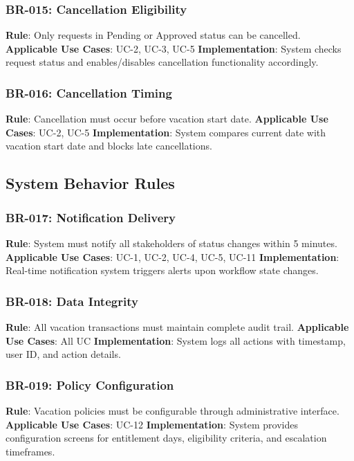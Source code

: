 \documentclass[12pt,a4paper]{article}
\begin{document}
\subsubsection{BR-015: Cancellation Eligibility}
\textbf{Rule}: Only requests in Pending or Approved status can be cancelled.
\textbf{Applicable Use Cases}: UC-2, UC-3, UC-5
\textbf{Implementation}: System checks request status and enables/disables cancellation functionality accordingly.

\subsubsection{BR-016: Cancellation Timing}
\textbf{Rule}: Cancellation must occur before vacation start date.
\textbf{Applicable Use Cases}: UC-2, UC-5
\textbf{Implementation}: System compares current date with vacation start date and blocks late cancellations.

\subsection{System Behavior Rules}

\subsubsection{BR-017: Notification Delivery}
\textbf{Rule}: System must notify all stakeholders of status changes within 5 minutes.
\textbf{Applicable Use Cases}: UC-1, UC-2, UC-4, UC-5, UC-11
\textbf{Implementation}: Real-time notification system triggers alerts upon workflow state changes.

\subsubsection{BR-018: Data Integrity}
\textbf{Rule}: All vacation transactions must maintain complete audit trail.
\textbf{Applicable Use Cases}: All UC
\textbf{Implementation}: System logs all actions with timestamp, user ID, and action details.

\subsubsection{BR-019: Policy Configuration}
\textbf{Rule}: Vacation policies must be configurable through administrative interface.
\textbf{Applicable Use Cases}: UC-12
\textbf{Implementation}: System provides configuration screens for entitlement days, eligibility criteria, and escalation timeframes.
\end{document}
